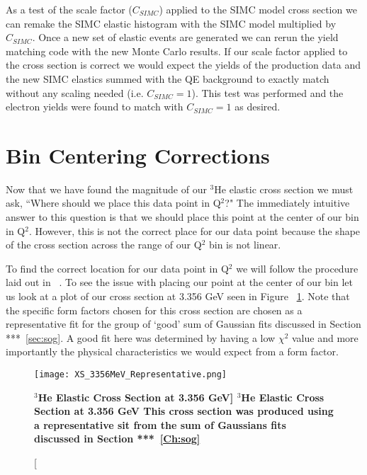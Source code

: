 As a test of the scale factor ($C_{SIMC}$) applied to the SIMC model cross section we can remake the SIMC elastic histogram with the SIMC model multiplied by $C_{SIMC}$. Once a new set of elastic events are generated we can rerun the yield matching code with the new Monte Carlo results. If our scale factor applied to the cross section is correct we would expect the yields of the production data and the new SIMC elastics summed with the QE background to exactly match without any scaling needed (i.e. $C_{SIMC}=1$). This test was performed and the electron yields were found to match with $C_{SIMC}=1$ as desired.

\section{Bin Centering Corrections}
\label{sec:bin_cor}

Now that we have found the magnitude of our $^3$He elastic cross section we must ask, ``Where should we place this data point in Q$^2$?" The immediately intuitive answer to this question is that we should place this point at the center of our bin in Q$^2$. However, this is not the correct place for our data point because the shape of the cross section across the range of our Q$^2$ bin is not linear.
 
To find the correct location for our data point in Q$^2$ we will follow the procedure laid out in ~\cite{Article:data_placement}. To see the issue with placing our point at the center of our bin let us look at a plot of our cross section at 3.356 GeV seen in Figure ~\ref{fig:xs_bin}. Note that the specific form factors chosen for this cross section are chosen as a representative fit for the group of `good' sum of Gaussian fits discussed in Section ***~\ref{sec:sog}. A good fit here was determined by having a low $\chi^2$ value and more importantly the physical characteristics we would expect from a form factor. 

\begin{figure}[!ht]
\begin{center}
\texttt{[image: XS\_3356MeV\_Representative.png]}
\end{center}
\caption[\bf{$^3$He Elastic Cross Section at 3.356 GeV}]{
{\bf{$^3$He Elastic Cross Section at 3.356 GeV}} This cross section was produced using a representative sit from the sum of Gaussians fits discussed in Section ***~\ref{Ch:sog}}
\label{fig:xs_bin}
\end{figure}

